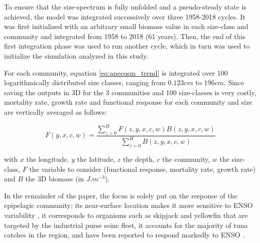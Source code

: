 To ensure that the size-spectrum is fully unfolded and a pseudo-steady state is achieved, the model was integrated successively over three 1958-2018 cycles. It was first initialized with an arbitrary small biomass value in each size-class and community and integrated from 1958 to 2018 (61 years). Then, the end of this first integration phase was used to run another cycle, which in turn was used to initialize the simulation analyzed in this study.

For each community, equation \ref{eq:apecosm_trend} is integrated over 100 logarithmically distributed size classes, ranging from $0.123cm$ to $196cm$. Since saving the outputs in 3D for the 3 communities and 100 size-classes is very costly, mortality rate, growth rate and functional response for each community and size are vertically averaged as follows:

\begin{equation}
F(y,x,c,w) = \frac{\sum_{z=0}^{H} F(z, y, x, c, w) B(z, y, x, c, w)}{\sum_{z=0}^{H}B(z, y, x, c, w	)}
\end{equation}

with $x$ the longitude, $y$ the latitude, $z$ the depth, $c$ the community, $w$ the size-class, $F$ the variable to consider (functional response, mortality rate, growth rate) and $B$ the 3D biomass (in $J.m^{-3}$).

In the remainder of the paper, the focus is solely put on the response of the epipelagic community; its near-surface location makes it more sensitive to ENSO variability \citep{lemezoNaturalVariabilityMarine2016}, it corresponds to organisms such as skipjack and yellowfin that are targeted by the industrial purse seine fleet, it accounts for the majority of tuna catches in the region, and have been reported to respond markedly to ENSO \citep{lehodeyNinoSouthernOscillation1997}.
